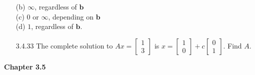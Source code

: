 \documentclass[10pt,twoside,reqno]{article}
\begin{document}
\begin{enumerate}
(b) $\infty$, regardless of $\pmb{b}$\\



(c) $0$ or $\infty$, depending on $\pmb{b}$\\



(d) $1$, regardless of $\pmb{b}$.\\



\vspace{3mm}


\item[3.4.33] The complete solution to $Ax = \left[\begin{smallmatrix} 1\\ 3 \end{smallmatrix} \right]$ is $x = \left[\begin{smallmatrix} 1\\ 0 \end{smallmatrix} \right] + c \left[\begin{smallmatrix} 0\\ 1 \end{smallmatrix} \right]$. Find $A$.\\
 \vspace{3mm}



\end{enumerate}
\vspace{5mm}
\textbf{Chapter 3.5}
\end{document}
